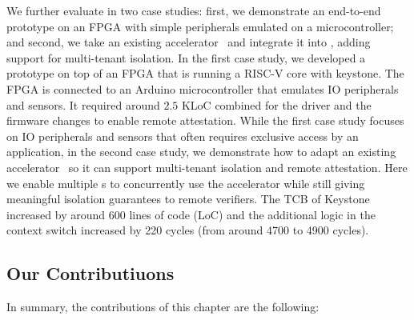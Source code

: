 We further evaluate \name{} in two case studies: first, we demonstrate an end-to-end prototype on an FPGA with simple peripherals emulated on a microcontroller; and second, we take an existing accelerator~\cite{zaruba2020manticore} and integrate it into \name{}, adding support for multi-tenant isolation. In the first case study, we developed a prototype on top of an FPGA that is running a RISC-V core with keystone. The FPGA is connected to an Arduino microcontroller that emulates IO peripherals and sensors. It required around $2.5$ KLoC combined for the driver and the firmware changes to enable remote attestation. 
While the first case study focuses on IO peripherals and sensors that often requires exclusive access by an application, in the second case study, we demonstrate how to adapt an existing accelerator~\cite{zaruba2020manticore} so it can support multi-tenant isolation and remote attestation. Here we enable multiple \name{}s to concurrently use the accelerator  while still giving meaningful isolation guarantees to remote verifiers. The TCB of Keystone increased by around $600$ lines of code (LoC) and the additional logic in the context switch increased by 220 cycles (from around 4700 to 4900 cycles). 

\subsection{Our Contributiuons}

In summary, the contributions of this chapter are the following:

